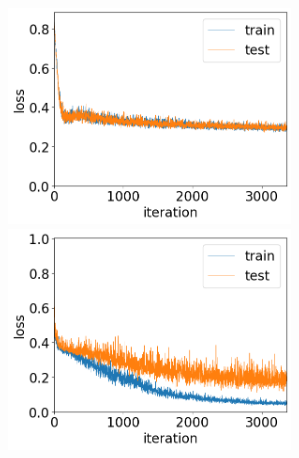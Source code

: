 \documentclass[11pt,a4paper,uplatex,draft]{ujarticle}
\begin{document}
  \begin{figure}[tbp]
    \begin{minipage}[b]{0.5\textwidth}
      \centering
      \includegraphics[keepaspectratio, width=75mm]{Images/python/loss_202402051931.png}
    \end{minipage}
    \begin{minipage}[b]{0.5\textwidth}
      \centering
      \includegraphics[keepaspectratio, width=75mm]{Images/python/loss_202402052150.png}
    \end{minipage}
  \end{figure}
\end{document}
